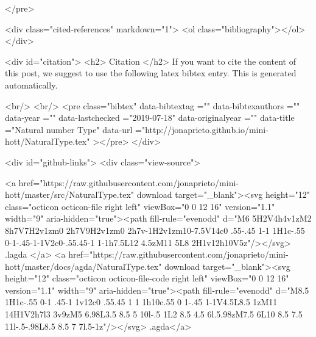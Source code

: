 </pre>


  <div class="cited-references" markdown="1">
  <ol class="bibliography"></ol>
  </div>


  
  <div id="citation">
  <h2> Citation </h2>
  If you want to cite the content of this post,
  we suggest to use the following latex bibtex entry.
  This is generated automatically.

  <br/>
  <br/>
  <pre class="bibtex"
       data-bibtextag =""
       data-bibtexauthors =""
       data-year =""
       data-lastchecked ="2019-07-18"
       data-originalyear =""
       data-title ="Natural number Type"
       data-url ="http://jonaprieto.github.io/mini-hott/NaturalType.tex"
  ></pre>
  </div>
  

  <div id="github-links">
    <div class="view-source">
      
        <a href="https://raw.githubusercontent.com/jonaprieto/mini-hott/master/src/NaturalType.tex" download target="_blank"><svg height="12" class="octicon octicon-file right left" viewBox="0 0 12 16" version="1.1" width="9" aria-hidden="true"><path fill-rule="evenodd" d="M6 5H2V4h4v1zM2 8h7V7H2v1zm0 2h7V9H2v1zm0 2h7v-1H2v1zm10-7.5V14c0 .55-.45 1-1 1H1c-.55 0-1-.45-1-1V2c0-.55.45-1 1-1h7.5L12 4.5zM11 5L8 2H1v12h10V5z"/></svg> .lagda </a>
        <a href="https://raw.githubusercontent.com/jonaprieto/mini-hott/master/docs/agda/NaturalType.tex" download target="_blank"><svg height="12" class="octicon octicon-file-code right left" viewBox="0 0 12 16" version="1.1" width="9" aria-hidden="true"><path fill-rule="evenodd" d="M8.5 1H1c-.55 0-1 .45-1 1v12c0 .55.45 1 1 1h10c.55 0 1-.45 1-1V4.5L8.5 1zM11 14H1V2h7l3 3v9zM5 6.98L3.5 8.5 5 10l-.5 1L2 8.5 4.5 6l.5.98zM7.5 6L10 8.5 7.5 11l-.5-.98L8.5 8.5 7 7l.5-1z"/></svg> .agda</a>
      
